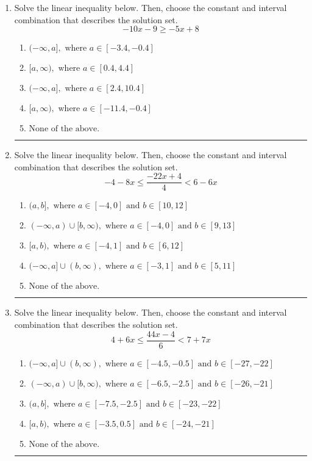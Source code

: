 \documentclass[14pt]{extbook}
\newcommand{\litem}[1]{\item#1\hspace*{-1cm}\rule{\textwidth}{0.4pt}}
\begin{document}
\begin{enumerate}
{\begin{enumerate}[label=\Alph*.]
\end{enumerate} }
\litem{
Solve the linear inequality below. Then, choose the constant and interval combination that describes the solution set.\[ -10x -9 \geq -5x + 8 \]\begin{enumerate}[label=\Alph*.]
\item \( (-\infty, a], \text{ where } a \in [-3.4, -0.4] \)
\item \( [a, \infty), \text{ where } a \in [0.4, 4.4] \)
\item \( (-\infty, a], \text{ where } a \in [2.4, 10.4] \)
\item \( [a, \infty), \text{ where } a \in [-11.4, -0.4] \)
\item \( \text{None of the above}. \)

\end{enumerate} }
\litem{
Solve the linear inequality below. Then, choose the constant and interval combination that describes the solution set.\[ -4 - 8 x \leq \frac{-22 x + 4}{4} < 6 - 6 x \]\begin{enumerate}[label=\Alph*.]
\item \( (a, b], \text{ where } a \in [-4, 0] \text{ and } b \in [10, 12] \)
\item \( (-\infty, a) \cup [b, \infty), \text{ where } a \in [-4, 0] \text{ and } b \in [9, 13] \)
\item \( [a, b), \text{ where } a \in [-4, 1] \text{ and } b \in [6, 12] \)
\item \( (-\infty, a] \cup (b, \infty), \text{ where } a \in [-3, 1] \text{ and } b \in [5, 11] \)
\item \( \text{None of the above.} \)

\end{enumerate} }
\litem{
Solve the linear inequality below. Then, choose the constant and interval combination that describes the solution set.\[ 4 + 6 x \leq \frac{44 x - 4}{6} < 7 + 7 x \]\begin{enumerate}[label=\Alph*.]
\item \( (-\infty, a] \cup (b, \infty), \text{ where } a \in [-4.5, -0.5] \text{ and } b \in [-27, -22] \)
\item \( (-\infty, a) \cup [b, \infty), \text{ where } a \in [-6.5, -2.5] \text{ and } b \in [-26, -21] \)
\item \( (a, b], \text{ where } a \in [-7.5, -2.5] \text{ and } b \in [-23, -22] \)
\item \( [a, b), \text{ where } a \in [-3.5, 0.5] \text{ and } b \in [-24, -21] \)
\item \( \text{None of the above.} \)

\end{enumerate} }
\end{enumerate}
\end{document}
